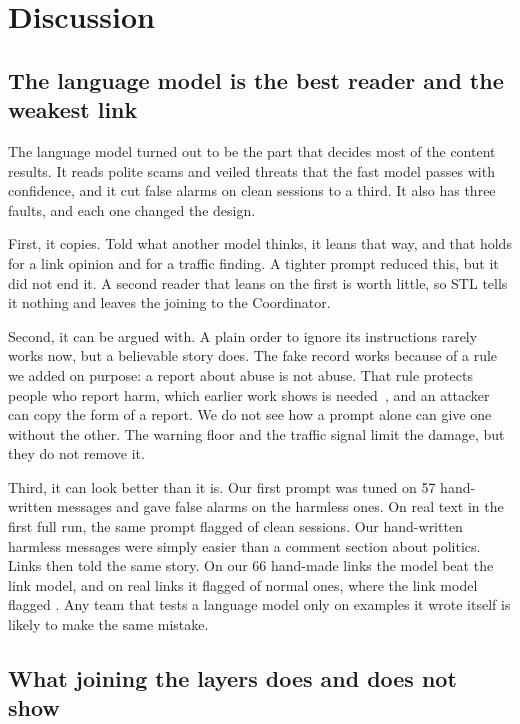\section{Discussion}
\label{sec:discussion}

\subsection{The language model is the best reader and the weakest link}

The language model turned out to be the part that decides most of the content results. It reads polite scams and veiled threats that the fast model passes with confidence, and it cut false alarms on clean sessions to a third. It also has three faults, and each one changed the design.

First, it copies. Told what another model thinks, it leans that way, and that holds for a link opinion and for a traffic finding. A tighter prompt reduced this, but it did not end it. A second reader that leans on the first is worth little, so STL tells it nothing and leaves the joining to the Coordinator.

Second, it can be argued with. A plain order to ignore its instructions rarely works now, but a believable story does. The fake record works because of a rule we added on purpose: a report about abuse is not abuse. That rule protects people who report harm, which earlier work shows is needed~\cite{gligoric}, and an attacker can copy the form of a report. We do not see how a prompt alone can give one without the other. The warning floor and the traffic signal limit the damage, but they do not remove it.

Third, it can look better than it is. Our first prompt was tuned on 57 hand-written messages and gave \firstRunHandWrong{} false alarms on the harmless ones. On real text in the first full run, the same prompt flagged \firstRunCleanFA{} of clean sessions. Our hand-written harmless messages were simply easier than a comment section about politics. Links then told the same story. On our 66 hand-made links the model beat the link model, and on real links it flagged \linkSampleWrong{} of \linkSampleEach{} normal ones, where the link model flagged \linkSampleFastWrong{}. Any team that tests a language model only on examples it wrote itself is likely to make the same mistake.

\subsection{What joining the layers does and does not show}

